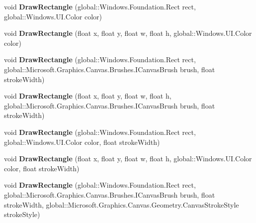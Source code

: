 \begin{DoxyCompactItemize}
void {\bfseries Draw\+Rectangle} (global\+::\+Windows.\+Foundation.\+Rect rect, global\+::\+Windows.\+U\+I.\+Color color)
\item 
\mbox{\label{interface_microsoft_1_1_graphics_1_1_canvas_1_1_i_canvas_drawing_session_a006dca4057187b46ebc6cb7270696a92}} 
void {\bfseries Draw\+Rectangle} (float x, float y, float w, float h, global\+::\+Windows.\+U\+I.\+Color color)
\item 
\mbox{\label{interface_microsoft_1_1_graphics_1_1_canvas_1_1_i_canvas_drawing_session_a7244fdf7597b47d3d572630ac2278744}} 
void {\bfseries Draw\+Rectangle} (global\+::\+Windows.\+Foundation.\+Rect rect, global\+::\+Microsoft.\+Graphics.\+Canvas.\+Brushes.\+I\+Canvas\+Brush brush, float stroke\+Width)
\item 
\mbox{\label{interface_microsoft_1_1_graphics_1_1_canvas_1_1_i_canvas_drawing_session_a21da7f5afc57a55caeb353c50f1e79c8}} 
void {\bfseries Draw\+Rectangle} (float x, float y, float w, float h, global\+::\+Microsoft.\+Graphics.\+Canvas.\+Brushes.\+I\+Canvas\+Brush brush, float stroke\+Width)
\item 
\mbox{\label{interface_microsoft_1_1_graphics_1_1_canvas_1_1_i_canvas_drawing_session_a2a30c4db1b017bd35354d76a06fffd0d}} 
void {\bfseries Draw\+Rectangle} (global\+::\+Windows.\+Foundation.\+Rect rect, global\+::\+Windows.\+U\+I.\+Color color, float stroke\+Width)
\item 
\mbox{\label{interface_microsoft_1_1_graphics_1_1_canvas_1_1_i_canvas_drawing_session_a3633aafe8dc2c5aa03e05c858a1b0802}} 
void {\bfseries Draw\+Rectangle} (float x, float y, float w, float h, global\+::\+Windows.\+U\+I.\+Color color, float stroke\+Width)
\item 
\mbox{\label{interface_microsoft_1_1_graphics_1_1_canvas_1_1_i_canvas_drawing_session_a298251ae7a182d7041d97d9da8758781}} 
void {\bfseries Draw\+Rectangle} (global\+::\+Windows.\+Foundation.\+Rect rect, global\+::\+Microsoft.\+Graphics.\+Canvas.\+Brushes.\+I\+Canvas\+Brush brush, float stroke\+Width, global\+::\+Microsoft.\+Graphics.\+Canvas.\+Geometry.\+Canvas\+Stroke\+Style stroke\+Style)

\end{DoxyCompactItemize}
